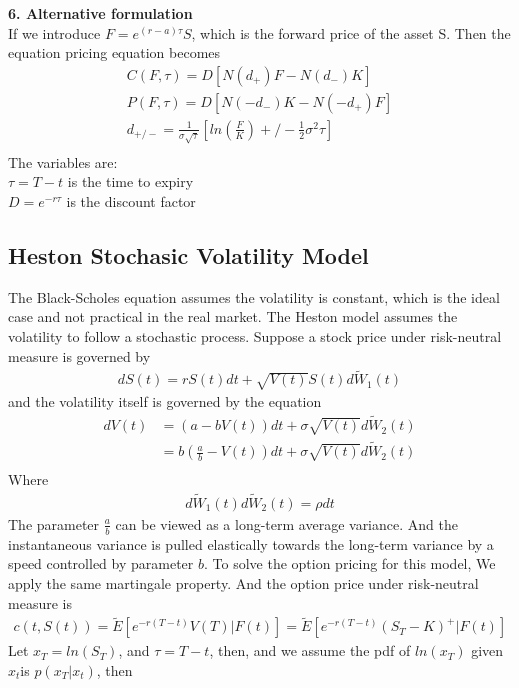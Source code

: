 \documentclass[a4paper]{article}
\begin{document}
{\bf 6. Alternative formulation}\\
If we introduce $F = e^{(r-a)\tau} S$, which is the forward price of the asset S. Then the equation pricing equation becomes
\begin{align*}
	C(F,\tau)= D[N(d_+)F - N(d_-)K] \\
	P(F,\tau)= D[N(-d_-)K - N(-d_+)F] \\
	d_{+/-} = \frac{1}{\sigma \sqrt{\tau}}[ln(\frac{F}{K})+/-\frac{1}{2}\sigma^2 \tau] \\
\end{align*}
The variables are:\\
$\tau = T - t$ is the time to expiry\\
$D = e^{-r\tau}$ is the discount factor \\
\subsection{Heston Stochasic Volatility Model}
The Black-Scholes equation assumes the volatility is constant, which is the ideal case and not practical in the real market. The Heston model\cite{heston} assumes the volatility to follow a stochastic process. Suppose a stock price under risk-neutral measure is governed by
\begin{align}
	dS(t) = rS(t)dt + \sqrt{V(t)} S(t) d \tilde W_1(t)
\end{align}
and the volatility itself is governed by the equation
\begin{align}
	dV(t) & = (a -bV(t))dt + \sigma \sqrt{V(t)} d \tilde W_2(t) \\
	      & = b(\frac{a}{b} -V(t))dt + \sigma \sqrt{V(t)} d \tilde W_2(t) \\
\end{align}
Where 
\begin{align*}
	d\tilde W_1(t) d\tilde W_2(t) = \rho dt
\end{align*}
The parameter $\frac{a}{b}$ can be viewed as a long-term average variance. And the instantaneous variance is pulled elastically towards the long-term variance by a speed controlled by parameter $b$. To solve the option pricing for this model, We apply the same martingale property. And the option price under risk-neutral measure is
\begin{align*}
	c(t, S(t)) = \tilde E[e^{-r(T-t)}V(T)| F(t)] = \tilde E[e^{-r(T-t)}(S_T - K)^{+}| F(t)]
\end{align*}
Let $x_T = ln(S_T)$, and $\tau = T - t$, then, and we assume the pdf of $ln(x_T)$ given $x_t$is $p(x_T | x_t)$, then
\end{document}
